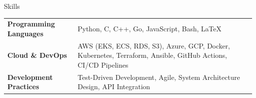 \documentclass{resume} %
\begin{document}
\begin{rSection}{Skills}
\begin{tabular}{ @{} >{\bfseries}l @{} p{4.2in} }
Programming Languages & Python, C, C++, Go, JavaScript, Bash, \LaTeX \\
Cloud \& DevOps & AWS (EKS, ECS, RDS, S3), Azure, GCP, Docker, Kubernetes, Terraform, Ansible, GitHub Actions, CI/CD Pipelines \\
Development Practices & Test-Driven Development, Agile, System Architecture Design, API Integration \\
\end{tabular}
\end{rSection}
\end{document}
